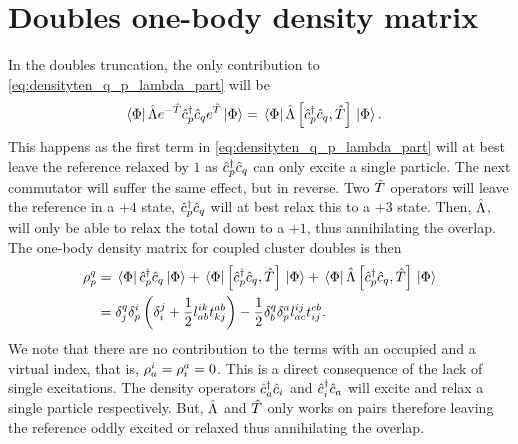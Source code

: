     \section{Doubles one-body density matrix}
        \label{app:ccd-density-matrices}
        In the doubles truncation, the only contribution to
        \autoref{eq:densityten_q_p_lambda_part} will be
        \begin{align}
            \bra*{\Phi}\hat{\Lambda} e^{-\hat{T}}\hat{c}_{p}^{\dagger}\hat{c}_{q}e^{\hat{T}}\ket*{\Phi}
            &= \bra*{\Phi}\hat{\Lambda} \left[\hat{c}_{p}^{\dagger}\hat{c}_{q}, \hat{T}\right]\ket*{\Phi}.
        \end{align}
        This happens as the first term in \autoref{eq:densityten_q_p_lambda_part} will
        at best leave the reference relaxed by $1$ as $\hat{c}_{p}^{\dagger}\hat{c}_{q}$ can only
        excite a single particle. The next commutator will suffer the same
        effect, but in reverse. Two $\hat{T}$ operators will leave the reference in a
        $+4$ state, $\hat{c}_{p}^{\dagger}\hat{c}_{q}$ will at best relax this to a $+3$ state.
        Then, $\hat{\Lambda}$, will only be able to relax the total down to a $+1$,
        thus annihilating the overlap. The one-body density matrix for coupled
        cluster doubles is then
        \begin{align}
            \rho^{q}_{p}
            &= \bra*{\Phi}\hat{c}_{p}^{\dagger}\hat{c}_{q}\ket*{\Phi}
            + \bra*{\Phi}\left[\hat{c}_{p}^{\dagger}\hat{c}_{q}, \hat{T}\right]\ket*{\Phi}
            + \bra*{\Phi}\hat{\Lambda} \left[\hat{c}_{p}^{\dagger}\hat{c}_{q}, \hat{T}\right]\ket*{\Phi}
            \\
            &=
            \delta^{q}_{j} \delta^{i}_{p} \left( 
                \delta^{j}_{i}
                + \frac{1}{2} l^{ik}_{ab} t^{ab}_{kj}
             \right)
            - \frac{1}{2} \delta^{q}_{b} \delta^{a}_{p} l^{ij}_{ac} t^{cb}_{ij}.
        \end{align}
        We note that there are no contribution to the terms with an occupied and
        a virtual index, that is, $\rho^{i}_{a} = \rho^{a}_{i} = 0$. This is a
        direct consequence of the lack of single excitations. The density
        operators $\hat{c}_{a}^{\dagger}\hat{c}_{i}$ and $\hat{c}_{i}^{\dagger}\hat{c}_{a}$ will excite and relax a
        single particle respectively. But, $\hat{\Lambda}$ and $\hat{T}$ only works on pairs
        therefore leaving the reference oddly excited or relaxed thus
        annihilating the overlap.

